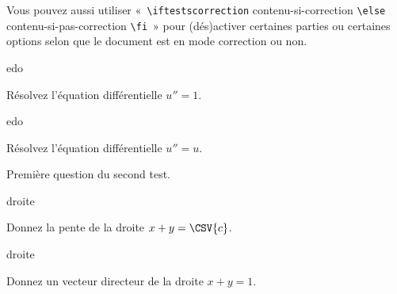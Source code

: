 \documentclass[12pt,a4paper, rulers%
]{tests}
\begin{document}
Vous pouvez aussi utiliser «~\verb+\iftestscorrection+
contenu-si-correction \verb+\else+ contenu-si-pas-correction
\verb+\fi+~» pour (dés)activer certaines parties ou certaines options
selon que le document est en mode correction ou non.

\vspace{3ex}

\begin{namequestion}{edo}%
  \begin{question}
    Résolvez l'équation différentielle $u'' = 1$.
  \end{question}
\end{namequestion}
\begin{namequestion}{edo}%
  \begin{question}
    Résolvez l'équation différentielle $u'' = u$.
  \end{question}
\end{namequestion}


\exam
{}%
\maketitle %

\begin{question}
  Première question du second test.
\end{question}


\begin{namequestion}{droite}
  \begin{question}
    Donnez la pente de la droite $x + y = \CSV{c}$.
  \end{question}
\end{namequestion}
\begin{namequestion}{droite}
  \begin{question}
    Donnez un vecteur directeur de la droite $x + y = 1$.    
  \end{question}
\end{namequestion}
\end{document}
